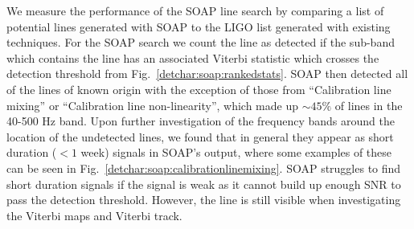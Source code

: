 We measure the performance of the SOAP line search by comparing a list of potential lines generated with SOAP to the \gls{LIGO} list generated with existing techniques.
For the SOAP search we count the line as detected if the sub-band which
contains the line has an associated Viterbi statistic which crosses the detection
threshold from Fig.~\ref{detchar:soap:rankedstats}.  SOAP then detected all of
the lines of known origin with the exception of those 
from ``Calibration line mixing'' or ``Calibration line non-linearity'', which made up $\sim 45\%$ of lines in the 40-500 Hz band.
Upon further investigation of the frequency bands around the location of the undetected lines, we found that in general they appear as
short duration ($< 1$ week) signals in SOAP's output, where some examples of
these can be seen in Fig.~\ref{detchar:soap:calibrationlinemixing}.  SOAP
struggles to find short duration signals if the signal is weak as it cannot
build up enough \gls{SNR} to pass the detection threshold. However, the line is
still visible when investigating the Viterbi maps and Viterbi track. 
%
